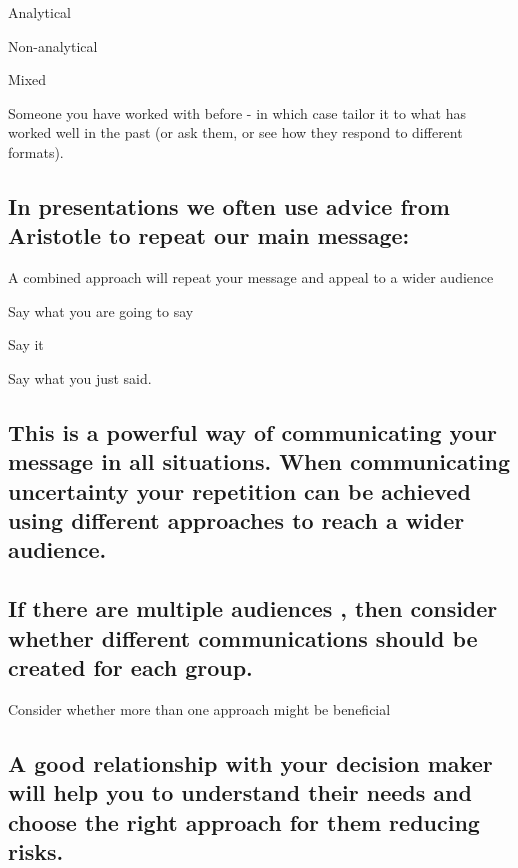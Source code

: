 \documentclass[]{book}
\begin{document}
Analytical

Non-analytical

Mixed

Someone you have worked with before - in which case tailor it to what
has worked well in the past (or ask them, or see how they respond to
different formats).

\subsection{In presentations we often use advice from Aristotle to
repeat our main
message:}\label{in-presentations-we-often-use-advice-from-aristotle-to-repeat-our-main-message}

 A combined approach will repeat your message and appeal to a wider
audience

Say what you are going to say

Say it

Say what you just said.

\subsection*{This is a powerful way of communicating your message in all
situations. When communicating uncertainty your repetition can be
achieved using different approaches to reach a wider
audience.}\label{this-is-a-powerful-way-of-communicating-your-message-in-all-situations.-when-communicating-uncertainty-your-repetition-can-be-achieved-using-different-approaches-to-reach-a-wider-audience.}

\subsection{If there are multiple audiences , then consider whether
different communications should be created for each
group.}\label{if-there-are-multiple-audiences-then-consider-whether-different-communications-should-be-created-for-each-group.}

 Consider whether more than one approach might be beneficial

\subsection{A good relationship with your decision maker will help you
to understand their needs and choose the right approach for them
reducing
risks.}\label{a-good-relationship-with-your-decision-maker-will-help-you-to-understand-their-needs-and-choose-the-right-approach-for-them-reducing-risks.}
\end{document}
